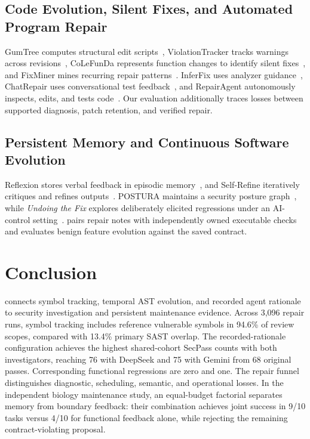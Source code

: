 \subsection{Code Evolution, Silent Fixes, and Automated Program Repair}
GumTree computes structural edit scripts~\cite{gumtree,gumtree3}, ViolationTracker tracks warnings across revisions~\cite{violationtracker}, CoLeFunDa represents function changes to identify silent fixes~\cite{colefunda}, and FixMiner mines recurring repair patterns~\cite{fixminer}. InferFix uses analyzer guidance~\cite{inferfix}, ChatRepair uses conversational test feedback~\cite{chatrepair}, and RepairAgent autonomously inspects, edits, and tests code~\cite{repairagent}. Our evaluation additionally traces losses between supported diagnosis, patch retention, and verified repair.


\subsection{Persistent Memory and Continuous Software Evolution}
Reflexion stores verbal feedback in episodic memory~\cite{reflexion}, and Self-Refine iteratively critiques and refines outputs~\cite{selfrefine}. POSTURA maintains a security posture graph~\cite{postura}, while \emph{Undoing the Fix} explores deliberately elicited regressions under an AI-control setting~\cite{undoingfix}. \tracer{} pairs repair notes with independently owned executable checks and evaluates benign feature evolution against the saved contract.

\section{Conclusion}
\tracer{} connects symbol tracking, temporal AST evolution, and recorded agent rationale to security investigation and persistent maintenance evidence. Across 3,096 repair runs, symbol tracking includes reference vulnerable symbols in 94.6\% of review scopes, compared with 13.4\% primary SAST overlap. The recorded-rationale configuration achieves the highest shared-cohort SecPass counts with both investigators, reaching 76 with DeepSeek and 75 with Gemini from 68 original passes. Corresponding functional regressions are zero and one. The repair funnel distinguishes diagnostic, scheduling, semantic, and operational losses. In the independent biology maintenance study, an equal-budget factorial separates memory from boundary feedback: their combination achieves joint success in 9/10 tasks versus 4/10 for functional feedback alone, while rejecting the remaining contract-violating proposal.

